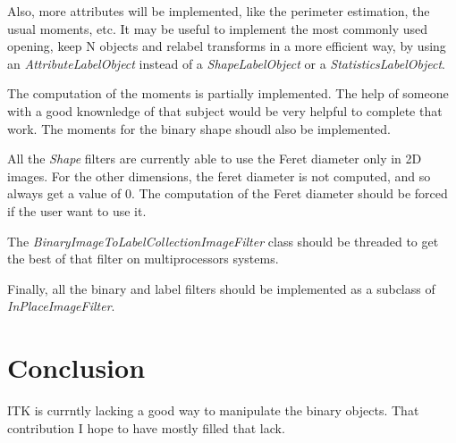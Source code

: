 \documentclass{InsightArticle}
\begin{document}
Also, more attributes will be implemented, like the perimeter estimation, the usual moments, etc. It may be useful to implement the most commonly used opening, keep N objects and relabel transforms in a more efficient way, by using an {\em AttributeLabelObject} instead of a {\em ShapeLabelObject} or a {\em StatisticsLabelObject}.

The computation of the moments is partially implemented. The help of someone with a good knownledge of that subject would be very helpful to complete that work. The moments for the binary shape shoudl also be implemented.

All the {\em Shape} filters are currently able to use the Feret diameter only in 2D images. For the other dimensions, the feret diameter is not computed, and so always get a value of $0$. The computation of the Feret diameter should be forced if the user want to use it.

The {\em BinaryImageToLabelCollectionImageFilter} class should be threaded to get the best of that filter on multiprocessors systems.

Finally, all the binary and label filters should be implemented as a subclass of {\em InPlaceImageFilter}.

\section{Conclusion}

ITK is currntly lacking a good way to manipulate the binary objects. That contribution I hope to have mostly
filled that lack.

\appendix





\nocite{ITKSoftwareGuide}
\end{document}
